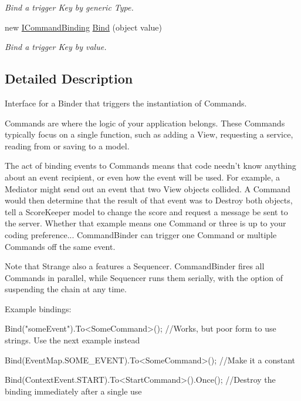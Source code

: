 \begin{DoxyCompactItemize}
\begin{DoxyCompactList}\small\item\em Bind a trigger Key by generic Type. \end{DoxyCompactList}\item 
\hypertarget{interfacestrange_1_1extensions_1_1command_1_1api_1_1_i_command_binder_a3e3e87b88d2e817dfbb183a8b947d909}{new \hyperlink{interfacestrange_1_1extensions_1_1command_1_1api_1_1_i_command_binding}{I\-Command\-Binding} \hyperlink{interfacestrange_1_1extensions_1_1command_1_1api_1_1_i_command_binder_a3e3e87b88d2e817dfbb183a8b947d909}{Bind} (object value)}\label{interfacestrange_1_1extensions_1_1command_1_1api_1_1_i_command_binder_a3e3e87b88d2e817dfbb183a8b947d909}

\begin{DoxyCompactList}\small\item\em Bind a trigger Key by value. \end{DoxyCompactList}\end{DoxyCompactItemize}


\subsection{Detailed Description}
Interface for a Binder that triggers the instantiation of Commands. 

Commands are where the logic of your application belongs. These Commands typically focus on a single function, such as adding a View, requesting a service, reading from or saving to a model.

The act of binding events to Commands means that code needn't know anything about an event recipient, or even how the event will be used. For example, a Mediator might send out an event that two View objects collided. A Command would then determine that the result of that event was to Destroy both objects, tell a Score\-Keeper model to change the score and request a message be sent to the server. Whether that example means one Command or three is up to your coding preference... Command\-Binder can trigger one Command or multiple Commands off the same event.

Note that Strange also a features a Sequencer. Command\-Binder fires all Commands in parallel, while Sequencer runs them serially, with the option of suspending the chain at any time.

Example bindings\-: \begin{DoxyVerb}Bind("someEvent").To<SomeCommand>(); //Works, but poor form to use strings. Use the next example instead

Bind(EventMap.SOME_EVENT).To<SomeCommand>(); //Make it a constant

Bind(ContextEvent.START).To<StartCommand>().Once(); //Destroy the binding immediately after a single use
\end{DoxyVerb}


